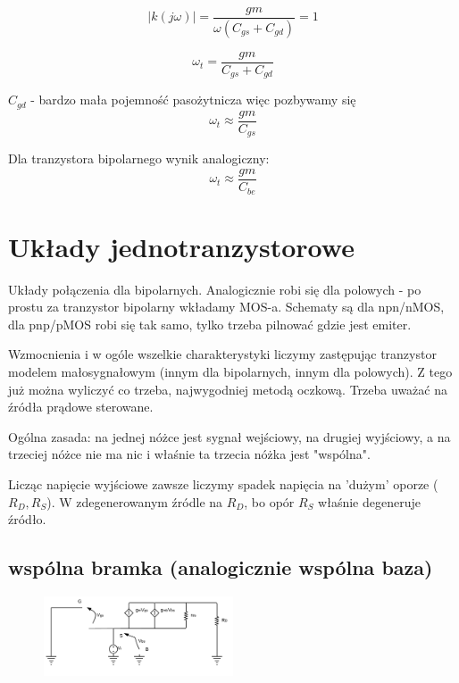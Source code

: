 \documentclass[10pt,a4paper]{article}
\begin{document}
\begin{equation}
|k(j\omega)| = \frac{gm}{\omega(C_{gs} + C_{gd})} = 1
\end{equation}

\begin{equation}
\omega _t = \frac{gm}{C_{gs} + C_{gd}}
\end{equation}

$C_{gd}$ - bardzo mała pojemność pasożytnicza więc pozbywamy się
\begin{equation}
\omega _t \approx \frac{gm}{C_{gs}}
\end{equation}

Dla tranzystora bipolarnego wynik analogiczny:
\begin{equation}
\omega _t \approx \frac{gm}{C_{be}}
\end{equation}


\section{Układy jednotranzystorowe}
Układy połączenia dla bipolarnych. Analogicznie robi się dla polowych - po prostu za tranzystor bipolarny wkładamy MOS-a. Schematy są dla npn/nMOS, dla pnp/pMOS robi się tak samo, tylko trzeba pilnować gdzie jest emiter.

Wzmocnienia i w ogóle wszelkie charakterystyki liczymy zastępując tranzystor modelem małosygnałowym (innym dla bipolarnych, innym dla polowych). Z tego już można wyliczyć co trzeba, najwygodniej metodą oczkową. Trzeba uważać na źródła prądowe sterowane.

Ogólna zasada: na jednej nóżce jest sygnał wejściowy, na drugiej wyjściowy, a na trzeciej nóżce nie ma nic i właśnie ta trzecia nóżka jest "wspólna".

Licząc napięcie wyjściowe zawsze liczymy spadek napięcia na 'dużym' oporze ($R_D,R_S$). W zdegenerowanym źródle na $R_D$, bo opór $R_S$ właśnie degeneruje źródło.
\subsection{wspólna bramka (analogicznie wspólna baza)}

\begin{figure}[H]
\centering
\includegraphics[width=0.5\textwidth]{CG.png}
\end{figure}
\end{document}
